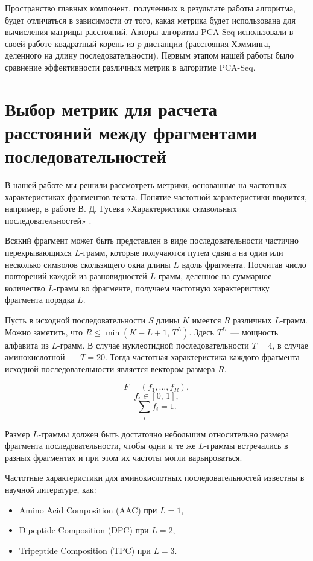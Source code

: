Пространство главных компонент, полученных в результате работы алгоритма, будет отличаться в зависимости от того, какая метрика будет использована для вычисления матрицы расстояний. Авторы алгоритма PCA-Seq использовали в своей работе квадратный корень из $p$-дистанции (расстояния Хэмминга, деленного на длину последовательности). Первым этапом нашей работы было сравнение эффективности различных метрик в алгоритме PCA-Seq.

\section{Выбор метрик для расчета расстояний между фрагментами последовательностей}

В нашей работе мы решили рассмотреть метрики, основанные на частотных характеристиках фрагментов текста. Понятие частотной характеристики вводится, например, в работе В. Д. Гусева «Характеристики символьных последовательностей» \cite{gusev}.

Всякий фрагмент может быть представлен в виде последовательности частично перекрывающихся $L$-грамм, которые получаются путем сдвига на один или несколько символов скользящего окна длины $L$ вдоль фрагмента. Посчитав число повторений каждой из разновидностей $L$-грамм, деленное на суммарное количество $L$-грамм во фрагменте, получаем частотную характеристику фрагмента порядка $L$.

Пусть в исходной последовательности $S$ длины $K$ имеется $R$ различных $L$-грамм. Можно заметить, что $R\leqslant\min(K-L+1,\, T^L)$. Здесь $T^L$~--- мощность алфавита из $L$-грамм. В случае нуклеотидной последовательности $T=4$, в случае аминокислотной~--- $T = 20$. Тогда частотная характеристика каждого фрагмента исходной последовательности является вектором размера $R$.

$$F = (f_1,\ldots,f_R),$$
$$f_i \in [0,\,1],$$
$$\sum_i f_i = 1.$$

Размер $L$-граммы должен быть достаточно небольшим относительно размера фрагмента последовательности, чтобы одни и те же $L$-граммы встречались в разных фрагментах и при этом их частоты могли варьироваться.

Частотные характеристики для аминокислотных последовательностей известны \cite{Bhasin2004} в научной литературе, как:
\begin{itemize}
  \item Amino Acid Composition (AAC) при $L = 1$,
  \item Dipeptide Composition (DPC) при  $L = 2$,
  \item Tripeptide Composition (TPC) при  $L = 3$.
\end{itemize}

